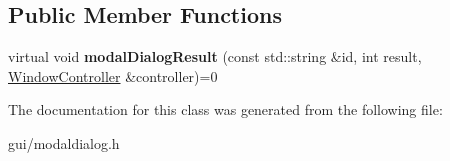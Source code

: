 \subsection*{Public Member Functions}
\begin{DoxyCompactItemize}
\item 
virtual void {\bfseries modal\+Dialog\+Result} (const std\+::string \&id, int result, \hyperlink{classWindowController}{Window\+Controller} \&controller)=0\hypertarget{classModalDialogCallback_a08d214604f9cf3c29d836a85102ac231}{}\label{classModalDialogCallback_a08d214604f9cf3c29d836a85102ac231}

\end{DoxyCompactItemize}


The documentation for this class was generated from the following file\+:\begin{DoxyCompactItemize}
\item 
gui/modaldialog.\+h\end{DoxyCompactItemize}
